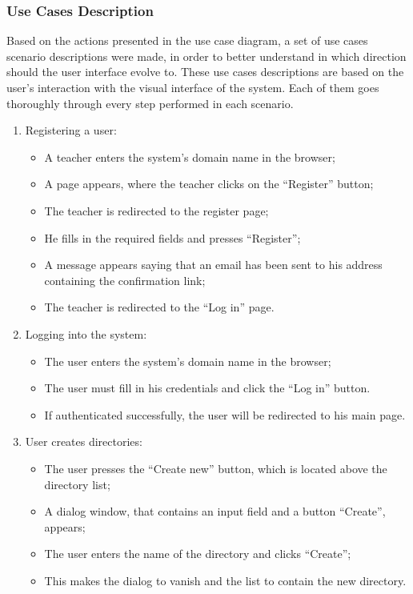 \subsubsection{Use Cases Description}
Based on the actions presented in the use case diagram, a set of use cases scenario descriptions were made, in order to better understand in which direction should the user interface evolve to. These use cases descriptions are based on the user's interaction with the visual interface of the system. Each of them goes thoroughly through every step performed in each scenario.
\begin{enumerate}
  \setlength{\parskip}{-5pt}
  \item Registering a user:
  \begin{itemize}
    \item A teacher enters the system’s domain name in the browser;
    \item A page appears, where the teacher clicks on the “Register” button;
    \item The teacher is redirected to the register page;
    \item He fills in the required fields and presses “Register”;
    \item A message appears saying that an email has been sent to his address containing the confirmation link;
    \item The teacher is redirected to the “Log in” page.
  \end{itemize}

  \item Logging into the system:
  \begin{itemize}
    \item The user enters the system’s domain name in the browser;
    \item The user must fill in his credentials and click the “Log in” button. 
    \item If authenticated successfully, the user will be redirected to his main page.
  \end{itemize}

  \item User creates directories:
  \begin{itemize}
    \item The user presses the “Create new” button, which is located above the directory list;
    \item A dialog window, that contains an input field and a button “Create”, appears;
    \item The user enters the name of  the directory and clicks “Create”;
    \item This makes the dialog to vanish and the list to contain the new directory.
  \end{itemize}


\end{enumerate}

